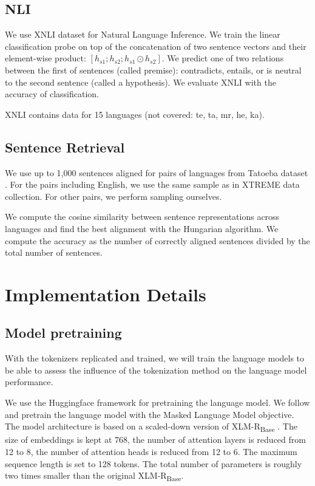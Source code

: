 \subsection{NLI}

We use XNLI dataset \cite{conneau_xnli_2018} for Natural Language Inference. We train the linear classification probe on top of the concatenation of two sentence vectors and their element-wise product: $[h_{s1}; h_{s2}; h_{s1} \odot h_{s2}]$. We predict one of two relations between the first of sentences (called premise): contradicts, entails, or is neutral to the second sentence (called a hypothesis). We evaluate XNLI with the accuracy of classification.

XNLI contains data for 15 languages (not covered: te, ta, mr, he, ka).

\subsection{Sentence Retrieval}
We use up to 1,000 sentences aligned for pairs of languages from Tatoeba dataset \cite{artetxe_massively_2019}. For the pairs including English, we use the same sample as in XTREME data collection. For other pairs, we perform sampling ourselves. 

We compute the cosine similarity between sentence representations across languages and find the best alignment with the Hungarian algorithm\cite{kuhn_hungarian_1955}. We compute the accuracy as the number of correctly aligned sentences divided by the total number of sentences.


\section{Implementation Details}

\subsection{Model pretraining}
\label{sec:model_pretraining}

With the tokenizers replicated and trained, we will train the language models to be able to assess the influence of the tokenization method on the language model performance.

We use the Huggingface framework \cite{wolf_transformers_2020} for pretraining the language model. We follow \citet{conneau_unsupervised_2020} and pretrain the language model with the Masked Language Model objective. The model architecture is based on a scaled-down version of XLM-R\textsubscript{Base} \cite{conneau_unsupervised_2020}. The size of embeddings is kept at 768, the number of attention layers is reduced from 12 to 8, the number of attention heads is reduced from 12 to 6. The maximum sequence length is set to 128 tokens. The total number of parameters is roughly two times smaller than the original XLM-R\textsubscript{Base}.

